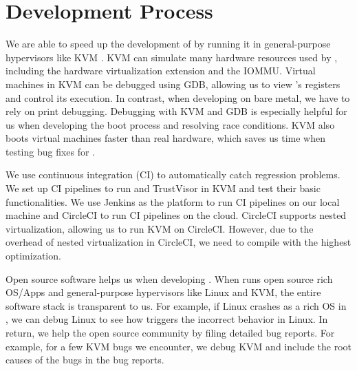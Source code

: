\section{Development Process}

We are able to speed up the development of  by running it in general-purpose hypervisors like KVM \cite{kivity2007kvm, ben2010turtles}. KVM can simulate many hardware resources used by , including the hardware virtualization extension and the IOMMU. Virtual machines in KVM can be debugged using GDB, allowing us to view 's registers and control its execution. In contrast, when developing on bare metal, we have to rely on print debugging. Debugging with KVM and GDB is especially helpful for us when developing the boot process and resolving race conditions. KVM also boots virtual machines faster than real hardware, which saves us time when testing bug fixes for .

We use continuous integration (CI) to automatically catch regression problems. We set up CI pipelines to run  and TrustVisor in KVM and test their basic functionalities. We use Jenkins \cite{jenkins_ci} as the platform to run CI pipelines on our local machine and CircleCI \cite{circle_ci} to run CI pipelines on the cloud. CircleCI supports nested virtualization, allowing us to run KVM on CircleCI. However, due to the overhead of nested virtualization in CircleCI, we need to compile  with the highest optimization.

Open source software helps us when developing . When  runs open source rich OS/Apps and general-purpose hypervisors like Linux and KVM, the entire software stack is transparent to us. For example, if Linux crashes as a rich OS in , we can debug Linux to see how  triggers the incorrect behavior in Linux. In return, we help the open source community by filing detailed bug reports. For example, for a few KVM bugs we encounter, we debug KVM and include the root causes of the bugs in the bug reports.

